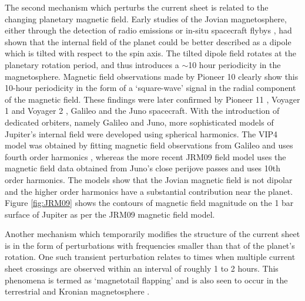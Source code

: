 The second mechanism which perturbs the current sheet is related to the changing planetary magnetic field. Early studies of the Jovian magnetosphere, either through the detection of radio emissions \cite{Carr1969TheJupiter} or in-situ spacecraft flybys \cite{Smith1974The10}, had shown that the internal field of the planet could be better described as a dipole which is tilted with respect to the spin axis. The tilted dipole field rotates at the planetary rotation period, and thus introduces a $\sim$10 hour periodicity in the magnetosphere. Magnetic field observations made by Pioneer 10 \cite{Smith1974The10} clearly show this 10-hour periodicity in the form of a `square-wave' signal in the radial component of the magnetic field. These findings were later confirmed by Pioneer 11 \cite{Smith1975Jupiters11}, Voyager 1 and Voyager 2 \cite{Behannon1981}, Galileo \cite{Khurana1992a, Khurana2005} and the Juno spacecraft. With the introduction of dedicated orbiters, namely Galileo and Juno, more sophisticated models of Jupiter's internal field were developed using spherical harmonics. The VIP4 model was obtained by fitting magnetic field observations from Galileo and uses fourth order harmonics \cite{Connerney1998NewFootprint}, whereas the more recent JRM09 field model \cite{Connerney2018} uses the magnetic field data obtained from Juno's close perijove passes and uses 10th order harmonics. The models show that the Jovian magnetic field is not dipolar and the higher order harmonics have a substantial contribution near the planet. Figure \ref{fig:JRM09} shows the contours of magnetic field magnitude on the 1 bar surface of Jupiter as per the JRM09 magnetic field model.

Another mechanism which temporarily modifies the structure of the current sheet is in the form of perturbations with frequencies smaller than that of the planet's rotation. One such transient perturbation relates to times when multiple current sheet crossings are observed within an interval of roughly 1 to 2 hours. This phenomena is termed as `magnetotail flapping' and is also seen to occur in the terrestrial and Kronian magnetosphere \cite{Volwerk2013ComparativeSaturn}. 

